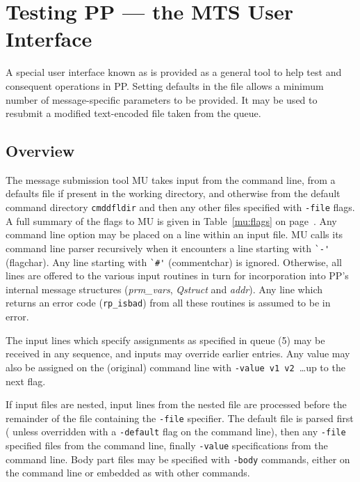 \chapter{Testing PP --- the MTS User Interface}

A special user interface known as  is
provided as a general tool to help test
 and consequent operations in PP.
Setting defaults in the  file allows a minimum
number of message-specific parameters to be provided.
It may be used to resubmit a modified text-encoded file taken from 
the queue.

\section{Overview}

The message submission tool MU takes input from the command
line, from a defaults file  if present in the 
working directory, and
otherwise from the default command directory \verb+cmddfldir+ and then
any other files specified with \verb+-file+ flags. A full summary of
the flags to MU is given in Table~\ref{mu:flags} on
page~\pageref{mu:flags}.  Any command line option may be placed on a
line within an input file.  MU calls its command line parser
recursively when it encounters a line starting with \verb+`-'+
(flagchar).  Any line starting with \verb+`#'+ (commentchar) is
ignored.  Otherwise, all lines are offered to the various
 input routines in turn for incorporation into PP's
internal message structures ({\em prm\_vars\/}, {\em Qstruct\/} and
{\em addr\/}).  Any line which returns an error code (\verb+rp_isbad+)
from all these routines is assumed to be in error.

The input lines which specify assignments as specified in queue (5) may
be received in any sequence, and inputs may override earlier entries.
Any value may also be assigned on the (original) command line with
\verb+-value v1 v2 +\ldots up to the next flag.

If input files are nested, input lines from the nested file are
processed before the remainder of the file containing the \verb+-file+
specifier.  The default file is parsed first (
unless overridden with a \verb+-default+ flag on the command line),
then any \verb+-file+ specified files from the command line, finally
\verb+-value+ specifications from the command line.  Body part files
may be specified with \verb+-body+ commands, either on the command
line or embedded as with other commands.\\

